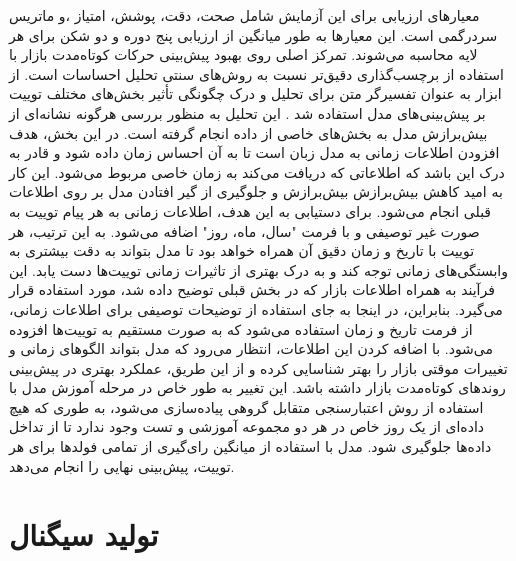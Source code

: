 معیارهای ارزیابی برای این آزمایش شامل صحت، دقت، پوشش، امتیاز ،و ماتریس سردرگمی است. این معیارها به طور میانگین از ارزیابی پنج دوره و دو شکن برای هر لایه محاسبه می‌شوند. تمرکز اصلی روی بهبود پیش‌بینی حرکات کوتاه‌مدت بازار با استفاده از برچسب‌گذاری دقیق‌تر نسبت به روش‌های سنتی تحلیل احساسات است.  از ابزار  به عنوان تفسیرگر متن برای تحلیل و درک چگونگی تأثیر بخش‌های مختلف توییت بر پیش‌بینی‌های مدل استفاده شد \cite{unified_lundberg_2017}. این تحلیل به منظور بررسی هرگونه نشانه‌ای از بیش‌برازش مدل به بخش‌های خاصی از داده انجام گرفته است. در این بخش، هدف افزودن اطلاعات زمانی به مدل زبان است تا به آن احساس زمان داده شود و قادر به درک این باشد که اطلاعاتی که دریافت می‌کند به زمان خاصی مربوط می‌شود. این کار به امید کاهش بیش‌برازش بیش‌برازش و جلوگیری از گیر افتادن مدل بر روی اطلاعات قبلی انجام می‌شود. برای دستیابی به این هدف، اطلاعات زمانی به هر پیام توییت به صورت غیر توصیفی و با فرمت "سال، ماه، روز" اضافه می‌شود. به این ترتیب، هر توییت با تاریخ و زمان دقیق آن همراه خواهد بود تا مدل بتواند به دقت بیشتری به وابستگی‌های زمانی توجه کند و به درک بهتری از تاثیرات زمانی توییت‌ها دست یابد. این فرآیند به همراه اطلاعات بازار که در بخش قبلی توضیح داده شد، مورد استفاده قرار می‌گیرد. بنابراین، در اینجا به جای استفاده از توضیحات توصیفی برای اطلاعات زمانی، از فرمت تاریخ و زمان استفاده می‌شود که به صورت مستقیم به توییت‌ها افزوده می‌شود. با اضافه کردن این اطلاعات، انتظار می‌رود که مدل بتواند الگوهای زمانی و تغییرات موقتی بازار را بهتر شناسایی کرده و از این طریق، عملکرد بهتری در پیش‌بینی روندهای کوتاه‌مدت بازار داشته باشد. این تغییر به طور خاص در مرحله آموزش مدل با استفاده از روش اعتبارسنجی متقابل گروهی پیاده‌سازی می‌شود، به طوری که هیچ داده‌ای از یک روز خاص در هر دو مجموعه آموزشی و تست وجود ندارد تا از تداخل داده‌ها جلوگیری شود. مدل با استفاده از میانگین رای‌گیری از تمامی فولدها برای هر توییت، پیش‌بینی نهایی را انجام می‌دهد.

\section{تولید سیگنال}
\label{sec:signal-generation}


